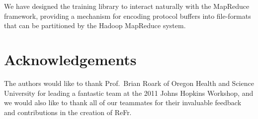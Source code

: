 \documentclass[a4paper]{article}
\begin{document}
We have designed the training library to interact naturally with the
MapReduce framework, providing a mechanism for encoding protocol buffers
into file-formats that can be partitioned by the Hadoop MapReduce
system.


\section{Acknowledgements}
The authors would like to thank Prof.\ Brian Roark of Oregon Health and
Science University for leading a fantastic team at the 2011 Johns
Hopkins Workshop, and we would also like to thank all of our teammates
for their invaluable feedback and contributions in the creation of
ReFr.

\newpage
%
\eightpt


\end{document}
